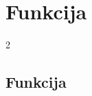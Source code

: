 \section{Funkcija}

\begin{frame}
    \sectionpage
\end{frame}

\begin{frame}
    \begin{multicols}{2}
    \end{multicols}
\end{frame}
        
\subsection{Funkcija}
